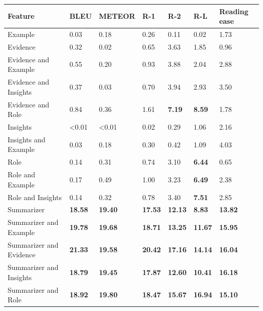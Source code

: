 \begin{tabular}{|l|l|l|l|l|l|l|}
\hline
\textbf{Feature} & BLEU & METEOR & R-1 & R-2 & R-L & Reading ease \\
 \hline
 Example & 0.03 & 0.18 & 0.26 & 0.11 & 0.02 & 1.73 \\
 \hline
 Evidence & 0.32 & 0.02 & 0.65 & 3.63 & 1.85 & 0.96 \\
 \hline
 Evidence and Example & 0.55 & 0.20 & 0.93 & 3.88 & 2.04 & 2.88 \\
 \hline
 Evidence and Insights & 0.37 & 0.03 & 0.70 & 3.94 & 2.93 & 3.50 \\
 \hline
 Evidence and Role & 0.84 & 0.36 & 1.61 & \textbf{7.19} & \textbf{8.59} & 1.78 \\
 \hline
 Insights & \textless{}0.01 & \textless{}0.01 & 0.02 & 0.29 & 1.06 & 2.16 \\
 \hline
 Insights and Example & 0.03 & 0.18 & 0.30 & 0.42 & 1.09 & 4.03 \\
 \hline
 Role & 0.14 & 0.31 & 0.74 & 3.10 & \textbf{6.44} & 0.65 \\
 \hline
 Role and Example & 0.17 & 0.49 & 1.00 & 3.23 & \textbf{6.49} & 2.38 \\
 \hline
 Role and Insights & 0.14 & 0.32 & 0.78 & 3.40 & \textbf{7.51} & 2.85 \\
 \hline
 Summarizer & \textbf{18.58} & \textbf{19.40} & \textbf{17.53} & \textbf{12.13} & \textbf{8.83} & \textbf{13.82} \\
 \hline
 Summarizer and Example & \textbf{19.78} & \textbf{19.68} & \textbf{18.71} & \textbf{13.25} & \textbf{11.67} & \textbf{15.95} \\
 \hline
 Summarizer and Evidence & \textbf{21.33} & \textbf{19.58} & \textbf{20.42} & \textbf{17.16} & \textbf{14.14} & \textbf{16.04} \\
 \hline
 Summarizer and Insights & \textbf{18.79} & \textbf{19.45} & \textbf{17.87} & \textbf{12.60} & \textbf{10.41} & \textbf{16.18} \\
 \hline
 Summarizer and Role & \textbf{18.92} & \textbf{19.80} & \textbf{18.47} & \textbf{15.67} & \textbf{16.94} & \textbf{15.10} \\
\hline
\end{tabular}
